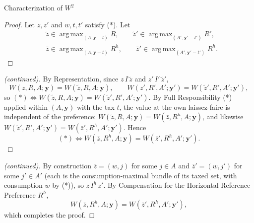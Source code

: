 \documentclass[10pt]{beamer}
\DeclareMathOperator*{\argmax}{arg\,max}
\begin{document}
\begin{frame}[allowframebreaks]{Characterization of $W^2$}
\begin{proof}
Let $z,z'$ and $w,t,t'$ satisfy (*). Let
\begin{equation*}
\begin{aligned}
&\tilde z\in\argmax_{(A,\mathbf y-t)}R,\qquad
\tilde z'\in\argmax_{(A',\mathbf y'-t')}R',\\
&\bar z\in\argmax_{(A,\mathbf y-t)}R^h,\qquad
\bar z'\in\argmax_{(A',\mathbf y'-t')}R^h.
\end{aligned}
\end{equation*}
\end{proof}
\framebreak
\begin{proof}[(continued)]
By Representation, since $z\,I\,\tilde z$ and $z'\,I'\,\tilde z'$,
\begin{equation*}
W(z,R,A;\mathbf y)=W(\tilde z,R,A;\mathbf y),\qquad
W(z',R',A';\mathbf y')=W(\tilde z',R',A';\mathbf y'),
\end{equation*}
so $(*)\Leftrightarrow W(\tilde z,R,A;\mathbf y)=W(\tilde z',R',A';\mathbf y')$.
By Full Responsibility (*) applied within $(A,\mathbf y)$ with the tax
$t$, the value at the own laissez-faire is independent of the preference:
$W(\tilde z,R,A;\mathbf y)=W(\bar z,R^h,A;\mathbf y)$, and likewise
$W(\tilde z',R',A';\mathbf y')=W(\bar z',R^h,A';\mathbf y')$. Hence
\begin{equation*}
(*)\Leftrightarrow W(\bar z,R^h,A;\mathbf y)=W(\bar z',R^h,A';\mathbf y').
\end{equation*}
\end{proof}
\framebreak
\begin{proof}[(continued)]
By construction $\bar z=(w,j)$ for some $j\in A$ and $\bar z'=(w,j')$ for some
$j'\in A'$ (each is the consumption-maximal bundle of its taxed set, with
consumption $w$ by (*)), so $\bar z\,I^h\,\bar z'$. By Compensation
for the Horizontal Reference Preference $R^h$,
\begin{equation*}
W(\bar z,R^h,A;\mathbf y)=W(\bar z',R^h,A';\mathbf y'),
\end{equation*}
which completes the proof.
\end{proof}

\medskip
\hyperlink{tab:classification}{}
\end{frame}
\end{document}
